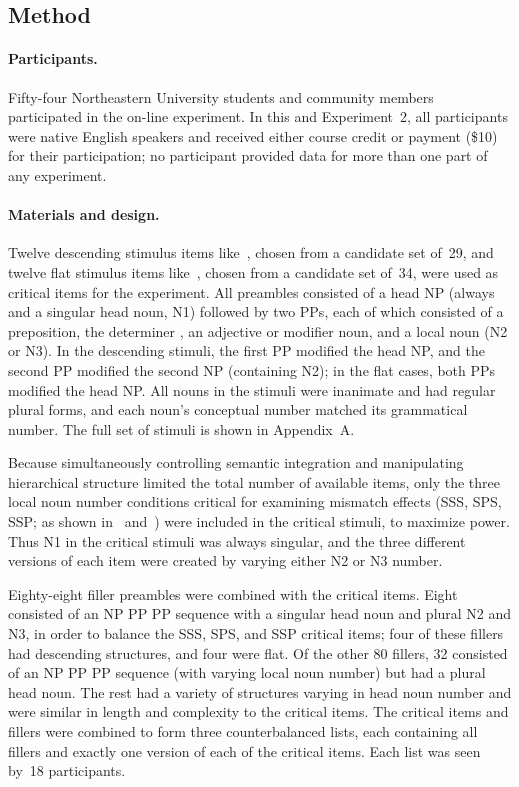 \documentclass[12pt,titlepage]{article}
\newcommand{\TODO}[1]{\textbf{*** #1 ***}}  %
\newcommand{\IGNORE}[1]{} %
\begin{document}
\subsection{Method}

\paragraph{Participants.} Fifty-four Northeastern University students and
community members participated in the on-line experiment.  In this and
Experiment~2, all participants were native English speakers and received
either course credit or payment (\$10) for their participation; no
participant provided data for more than one part of any experiment.

\paragraph{Materials and design.} Twelve descending stimulus items
like~, chosen from a candidate set of~29, and twelve flat
stimulus items like~, chosen from a candidate set of~34, were
used as critical items for the experiment.  All preambles consisted of a
head NP (always  and a singular head noun, N1) followed by two
PPs, each of which consisted of a preposition, the determiner , an
adjective or modifier noun, and a local noun (N2 or N3).  In the descending
stimuli, the first PP modified the head NP, and the second PP modified the
second NP (containing N2); in the flat cases, both PPs modified the head
NP\@.  All nouns in the stimuli were inanimate and had regular plural
forms, and each noun's conceptual number matched its grammatical
number.\IGNORE{\TODO{syllable-length matching?}} The full set of stimuli is
shown in Appendix~A.

Because simultaneously controlling semantic integration and
manipulating hierarchical structure limited the total number of
available items, only the three local noun number conditions critical
for examining mismatch effects (SSS, SPS, SSP; as shown
in~ and~) were included in the critical
stimuli, to maximize power.  Thus N1 in the critical stimuli was
always singular, and the three different versions of each item were
created by varying either N2 or N3 number.

Eighty-eight filler preambles were combined with the critical items.  Eight
consisted of an NP PP PP sequence with a singular head noun and plural N2
and N3, in order to balance the SSS, SPS, and SSP critical items; four of
these fillers had descending structures, and four were flat.  Of the other
80 fillers, 32 consisted of an NP PP PP sequence (with varying local noun
number) but had a plural head noun.  The rest had a variety of structures
varying in head noun number and were similar in length and complexity to
the critical items.  The critical items and fillers were combined to form
three counterbalanced lists, each containing all fillers and exactly one
version of each of the critical items.  Each list was seen by~18 
participants.
\end{document}
